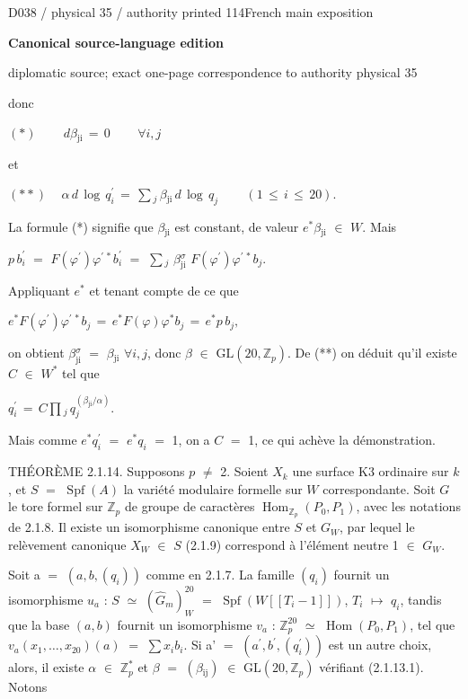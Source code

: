 \documentclass[9pt]{article}
\newcommand{\CanonText}[1]{\par{\fontsize{8.0}{9.35}\selectfont\RaggedRight #1\par}\vspace{2.2pt}}
\newcommand{\CanonDisplay}[1]{\par\vspace{1.2pt}\begin{center}{\fontsize{7.2}{8.4}\selectfont\(\displaystyle #1\)}\end{center}\vspace{1.2pt}}
\newcommand{\LayerTitle}{Canonical source-language edition}
\begin{document}
\noindent\begin{minipage}[t][\dimexpr\textheight-5pt\relax][t]{\textwidth}
{\sffamily\fontsize{7.3}{8.2}\selectfont\color{Quiet} D038 / physical 35 / authority printed 114\hfill French main exposition}
\par{}\vspace{4.5pt}
{\sffamily\fontsize{10.4}{11.6}\selectfont\bfseries\color{Accent} \LayerTitle}
\par{\sffamily\fontsize{6.7}{7.7}\selectfont\color{Quiet} diplomatic source; exact one-page correspondence to authority physical 35}
\vspace{5pt}
\CanonText{donc}
\CanonDisplay{(*)\qquad\,d\beta{}_{\mathrm{ji}}\,=\,0\qquad\,\forall{}i,j}
\CanonText{et}
\CanonDisplay{(**)\quad\,\alpha{}\,d\,\operatorname{log}\,q^{\prime}_{i}\,=\,\sum{}_{j}\,\beta{}_{\mathrm{ji}}\,d\,\operatorname{log}\,q_{j}\qquad\,(1\,\leq{}\,i\,\leq{}\,20).}
\CanonText{La formule (*) signifie que \(\beta{}_{\mathrm{ji}}\) est constant, de valeur \(e^{*}\beta{}_{\mathrm{ji}}\) \(\in{}\) \(W\). Mais}
\CanonText{\(p\,b^{\prime}_{i}\) \(=\) \(F(\varphi{}^{\prime})\varphi{}^{\prime\,*}b^{\prime}_{i}\) \(=\) \(\sum{}_{j}\) \(\beta{}_{\mathrm{ji}}^\sigma{}\) \(F(\varphi{}^{\prime})\varphi{}^{\prime\,*}b_{j}\).}
\CanonText{Appliquant \(e^{*}\) et tenant compte de ce que}
\CanonDisplay{e^{*}F(\varphi{}^{\prime})\varphi{}^{\prime\,*}b_{j}\,=\,e^{*}F(\varphi{})\varphi{}^{*}b_{j}\,=\,e^{*}p\,b_{j},}
\CanonText{on obtient \(\beta{}_{\mathrm{ji}}^\sigma{}\) \(=\) \(\beta{}_{\mathrm{ji}}\) \(\forall{}i,j\), donc \(\beta{}\) \(\in{}\) \(\mathrm{GL}(20,\mathbb{Z}_{p})\). De (**) on déduit qu'il existe \(C\) \(\in{}\) \(W^{*}\) tel que}
\CanonDisplay{q^{\prime}_{i}\,=\,C\prod{}_{j}\,q_{j}^{(\beta{}_{\mathrm{ji}}/\alpha{})}.}
\CanonText{Mais comme \(e^{*}q^{\prime}_{i}\) \(=\) \(e^{*}q_{i}\) \(=\) 1, on a \(C\) \(=\) 1, ce qui achève la démonstration.}
\CanonText{THÉORÈME 2.1.14. Supposons \(p\) \(\neq{}\) 2. Soient \(X_{k}\) une surface K3 ordinaire sur \(k\), et \(S\) \(=\) \(\operatorname{Spf}(A)\) la variété modulaire formelle sur \(W\) correspondante. Soit \(G\) le tore formel sur \(\mathbb{Z}_{p}\) de groupe de caractères \(\operatorname{Hom}_{\mathbb{Z}_{p}}(P_{0},P_{1})\), avec les notations de 2.1.8. Il existe un isomorphisme canonique entre \(S\) et \(G_{W}\), par lequel le relèvement canonique \(X_{W}\) \(\in{}\) \(S\) (2.1.9) correspond à l'élément neutre 1 \(\in{}\) \(G_{W}\).}
\CanonText{Soit a \(=\) \((a,b,(q_{i}))\) comme en 2.1.7. La famille \((q_{i})\) fournit un isomorphisme \(u_{a}\) : \(S\) \(\simeq{}\) \((\widehat{G}_{m})_{W}^{20}\) \(=\) \(\operatorname{Spf}(W[[T_{i}-1]])\), \(T_{i}\) \(\mapsto{}\) \(q_{i}\), tandis que la base \((a,b)\) fournit un isomorphisme \(v_{a}\) : \(\mathbb{Z}_{p}^{20}\) \(\simeq{}\) \(\operatorname{Hom}(P_{0},P_{1})\), tel que \(v_{a}(x_{1},\ldots{},x_{20})(a)\) \(=\) \(\sum{}x_{i}b_{i}\). Si a' \(=\) \((a^{\prime},b^{\prime},(q^{\prime}_{i}))\) est un autre choix, alors, il existe \(\alpha{}\) \(\in{}\) \(\mathbb{Z}_{p}^{*}\) et \(\beta{}\) \(=\) \((\beta{}_{\mathrm{ij}})\) \(\in{}\) \(\mathrm{GL}(20,\mathbb{Z}_{p})\) vérifiant (2.1.13.1). Notons}

\end{minipage}
\end{document}
